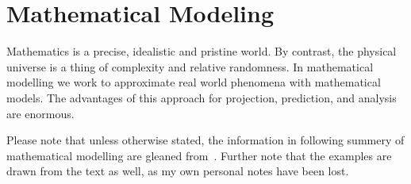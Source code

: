 \section{Mathematical Modeling}%

Mathematics is a precise, idealistic and pristine world. By contrast, the physical universe is a thing of complexity and relative randomness. In mathematical modelling we work to approximate real world phenomena with mathematical models. The advantages of this approach for projection, prediction, and analysis are enormous.

Please note that unless otherwise stated, the information in following summery of mathematical modelling are gleaned from~\cite{NumAnaly}. Further note that the examples are drawn from the text as well, as my own personal notes have been lost. 









